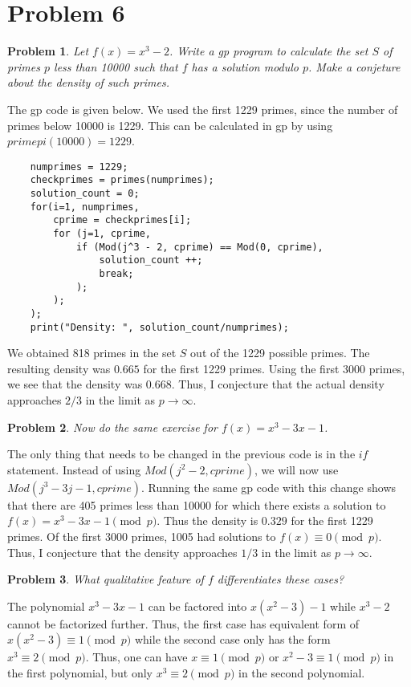 \documentclass[psamsfonts]{amsart}
\newtheorem{prob}{Problem}[section]
\newenvironment{sol}{{\bfseries Solution}}{\qedsymbol}
\theoremstyle{definition}
\theoremstyle{remark}
\numberwithin{equation}{section}
\begin{document}
\section{Problem 6}

\begin{prob}
Let $f(x) = x^3 - 2$. Write a gp program to calculate the set $S$ of primes $p$ less than 10000 such that $f$ has a solution modulo $p$. Make a conjeture about the density of such primes.
\end{prob}

\begin{sol}
The gp code is given below. We used the first 1229 primes, since the number of primes below 10000 is 1229. This can be calculated in gp by using $primepi(10000) = 1229$. 

\begin{verbatim}
    numprimes = 1229;
    checkprimes = primes(numprimes);
    solution_count = 0;
    for(i=1, numprimes,
        cprime = checkprimes[i];
        for (j=1, cprime,
            if (Mod(j^3 - 2, cprime) == Mod(0, cprime), 
                solution_count ++;
                break;
            );
        );
    );
    print("Density: ", solution_count/numprimes);
\end{verbatim}

We obtained 818 primes in the set $S$ out of the 1229 possible primes. The resulting density was $0.665$ for the first 1229 primes. Using the first 3000 primes, we see that the density was $0.668$. Thus, I conjecture that the actual density approaches $2/3$ in the limit as $p \to \infty$. 
\end{sol}

\begin{prob}
Now do the same exercise for $f(x) = x^3 - 3x - 1$. 
\end{prob}

\begin{sol}
The only thing that needs to be changed in the previous code is in the $if$ statement. Instead of using $Mod(j^2 - 2, cprime)$, we will now use $Mod(j^3 - 3j - 1, cprime)$. Running the same gp code with this change shows that there are 405 primes less than 10000 for which there exists a solution to $f(x) = x^3 - 3x - 1 \pmod{p}$. Thus the density is $0.329$ for the first 1229 primes. Of the first 3000 primes, 1005 had solutions to $f(x) \equiv 0 \pmod{p}$. Thus, I conjecture that the density approaches $1/3$ in the limit as $p \to \infty$.
\end{sol}

\begin{prob}
What qualitative feature of $f$ differentiates these cases?
\end{prob}

\begin{sol}
The polynomial $x^3 - 3x - 1$ can be factored into $x(x^2 - 3) - 1$ while $x^3 - 2$ cannot be factorized further. Thus, the first case has equivalent form of $x (x^2 - 3) \equiv 1 \pmod{p}$ while the second case only has the form $x^3 \equiv 2 \pmod{p}$. Thus, one can have $x \equiv 1 \pmod{p}$ or $x^2 - 3 \equiv 1 \pmod{p}$ in the first polynomial, but only $x^3 \equiv 2 \pmod{p}$ in the second polynomial.
\end{sol}
\end{document}
